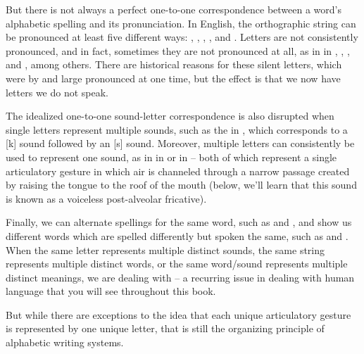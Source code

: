 But there is not always a perfect one-to-one correspondence between a word's alphabetic
spelling and its pronunciation.  In English,  the orthographic
string  can be pronounced at least five
different ways: , , , , and
.  Letters
are not consistently pronounced, and in fact, sometimes they are not
pronounced at all, as in   in ,
, , and , among others.  There
are historical reasons for these silent letters, which were by and
large pronounced at one time, but the effect is that we now have
letters we do not speak.

The idealized one-to-one sound-letter correspondence is also disrupted when single letters  represent
multiple sounds, such as the  in , which
corresponds to a [k] sound followed by an [s] sound.
Moreover, multiple letters can consistently be used to represent one sound,
as in   in  or   in
 -- both of which represent a single articulatory gesture in which air is channeled through a narrow passage created by raising the tongue to the roof of the mouth (below, we'll learn that this sound is known as a voiceless post-alveolar fricative).

Finally, we can alternate spellings for the same word, such as
 and , and
 show us different words which are
spelled differently but spoken the same, such as  and
.  When the same letter represents multiple distinct sounds,  the same string represents multiple distinct words, or the same word/sound represents multiple distinct meanings, we are dealing with  --  a recurring issue in dealing with human language that you will see throughout this book.

But while there are exceptions to the idea that each unique articulatory gesture is represented by one unique letter, that is still the organizing principle of alphabetic writing systems.


